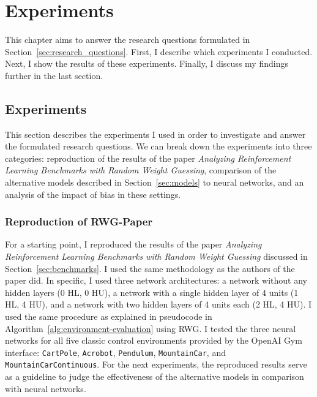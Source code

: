 
\chapter{Experiments}
\label{ch:experiments}
This chapter aims to answer the research questions formulated in Section~\ref{sec:research_questions}. First, I describe which experiments I conducted. Next, I show the results of these experiments. Finally, I discuss my findings further in the last section.

\section{Experiments}
This section describes the experiments I used in order to investigate and answer the formulated research questions. We can break down the experiments into three categories: reproduction of the results of the paper \emph{Analyzing Reinforcement Learning Benchmarks with Random Weight Guessing}, comparison of the alternative models described in Section~\ref{sec:models} to neural networks, and an analysis of the impact of bias in these settings.

\subsection{Reproduction of RWG-Paper}
For a starting point, I reproduced the results of the paper \emph{Analyzing Reinforcement Learning Benchmarks with Random Weight Guessing} discussed in Section~\ref{sec:benchmarks}. I used the same methodology as the authors of the paper did. In specific, I used three network architectures: a network without any hidden layers (0 HL, 0 HU), a network with a single hidden layer of 4 units (1 HL, 4 HU), and a network with two hidden layers of 4 units each (2 HL, 4 HU). I used the same procedure as explained in pseudocode in Algorithm~\ref{alg:environment-evaluation} using RWG. I tested the three neural networks for all five classic control environments provided by the OpenAI Gym interface: \verb|CartPole|, \verb|Acrobot|, \verb|Pendulum|, \verb|MountainCar|, and \verb|MountainCarContinuous|. For the next experiments, the reproduced results serve as a guideline to judge the effectiveness of the alternative models in comparison with neural networks.

